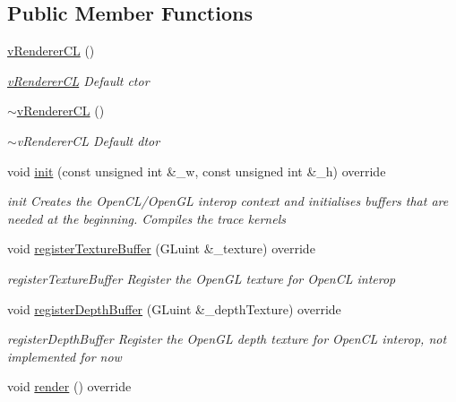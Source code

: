\subsection*{Public Member Functions}
\begin{DoxyCompactItemize}
\item 
\hypertarget{classvRendererCL_a2cc108d7d1b229d5e7ee864e4ba887fb}{\hyperlink{classvRendererCL_a2cc108d7d1b229d5e7ee864e4ba887fb}{v\-Renderer\-C\-L} ()}\label{classvRendererCL_a2cc108d7d1b229d5e7ee864e4ba887fb}

\begin{DoxyCompactList}\small\item\em \hyperlink{classvRendererCL}{v\-Renderer\-C\-L} Default ctor \end{DoxyCompactList}\item 
\hypertarget{classvRendererCL_a30d5cceb0fe2a0592707730a8c61ddf2}{\hyperlink{classvRendererCL_a30d5cceb0fe2a0592707730a8c61ddf2}{$\sim$v\-Renderer\-C\-L} ()}\label{classvRendererCL_a30d5cceb0fe2a0592707730a8c61ddf2}

\begin{DoxyCompactList}\small\item\em $\sim$v\-Renderer\-C\-L Default dtor \end{DoxyCompactList}\item 
void \hyperlink{classvRendererCL_a01207b7fea56df11fc2af4cb87cad7e4}{init} (const unsigned int \&\-\_\-w, const unsigned int \&\-\_\-h) override
\begin{DoxyCompactList}\small\item\em init Creates the Open\-C\-L/\-Open\-G\-L interop context and initialises buffers that are needed at the beginning. Compiles the trace kernels \end{DoxyCompactList}\item 
void \hyperlink{classvRendererCL_a124b31960cb2e8cfe821acf888e712a9}{register\-Texture\-Buffer} (G\-Luint \&\-\_\-texture) override
\begin{DoxyCompactList}\small\item\em register\-Texture\-Buffer Register the Open\-G\-L texture for Open\-C\-L interop \end{DoxyCompactList}\item 
void \hyperlink{classvRendererCL_a663d4055fdcc26820c769a3ed11a7cfd}{register\-Depth\-Buffer} (G\-Luint \&\-\_\-depth\-Texture) override
\begin{DoxyCompactList}\small\item\em register\-Depth\-Buffer Register the Open\-G\-L depth texture for Open\-C\-L interop, not implemented for now \end{DoxyCompactList}\item 
\hypertarget{classvRendererCL_a7bc6f37f611bc3d356ca25c6e2cd200b}{void \hyperlink{classvRendererCL_a7bc6f37f611bc3d356ca25c6e2cd200b}{render} () override}\label{classvRendererCL_a7bc6f37f611bc3d356ca25c6e2cd200b}


\end{DoxyCompactItemize}
